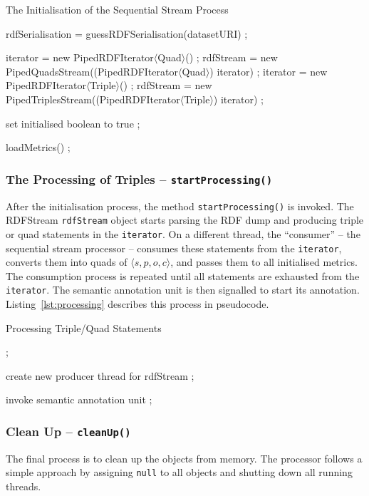 \begin{algorithm}
\caption{The Initialisation of the Sequential Stream Process}
\label{lst:setUp}
\begin{algorithmic}[1]
\State rdfSerialisation = guessRDFSerialisation(datasetURI) ;

\State iterator = new PipedRDFIterator$\langle$Quad$\rangle$() ;
\State rdfStream = new PipedQuadsStream((PipedRDFIterator$\langle$Quad$\rangle$) iterator) ;
\EndIf
{} 
\State iterator = new PipedRDFIterator$\langle$Triple$\rangle$() ;
\State rdfStream = new PipedTriplesStream((PipedRDFIterator$\langle$Triple$\rangle$) iterator) ;
\EndIf

\State set initialised boolean to true ;

\State loadMetrics() ;
\EndProcedure
\end{algorithmic}
\end{algorithm}

\subsubsection{The Processing of Triples – \texttt{startProcessing()}}
After the initialisation process, the method \texttt{startProcessing()} is invoked.
The RDFStream \texttt{rdfStream} object starts parsing the RDF dump and producing triple or quad statements in the \texttt{iterator}.
On a different thread, the ``consumer'' – the sequential stream processor – consumes these statements from the \texttt{iterator}, converts them into quads of $\langle s,p,o,c \rangle$, and passes them to all initialised metrics.
The consumption process is repeated until all statements are exhausted from the \texttt{iterator}.
The semantic annotation unit is then signalled to start its annotation.
Listing~\ref{lst:processing} describes this process in pseudocode.

\begin{algorithm}
\caption{Processing Triple/Quad Statements}
\label{lst:processing}
\begin{algorithmic}[1]
  ; \EndIf

\State create new producer thread for rdfStream ;

\EndWhile

\State invoke semantic annotation unit ;
\EndProcedure
\end{algorithmic}
\end{algorithm}

\subsubsection{Clean Up – \texttt{cleanUp()}}
The final process is to clean up the objects from memory.
The processor follows a simple approach by assigning \texttt{null} to all objects and shutting down all running threads.

